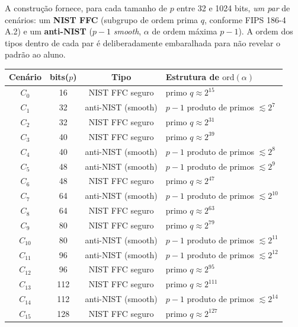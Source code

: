 \documentclass[12pt,a4paper]{article}
\begin{document}
\begin{tcolorbox}[colback=red!5, colframe=red!40, title=\textbf{Tipo de cada cenário e $\mathrm{ord}(\alpha)$}, fonttitle=\small]
\small
A construção fornece, para cada tamanho de $p$ entre 32 e 1024 bits, \emph{um par} de cenários: um \textbf{NIST FFC} (subgrupo de ordem prima $q$, conforme FIPS 186-4 A.2) e um \textbf{anti-NIST} ($p-1$ \emph{smooth}, $\alpha$ de ordem máxima $p-1$). A ordem dos tipos dentro de cada par é deliberadamente embaralhada para não revelar o padrão ao aluno.

\begin{center}
\scriptsize
\begin{tabular}{cccl}
\toprule
\textbf{Cenário} & \textbf{bits($p$)} & \textbf{Tipo} & \textbf{Estrutura de $\mathrm{ord}(\alpha)$} \\
\midrule
$C_0$    & 16   & NIST FFC seguro    & primo $q \approx 2^{15}$ \\
$C_1$    & 32   & anti-NIST (smooth) & $p-1$ produto de primos $\lesssim 2^{7}$ \\
$C_2$    & 32   & NIST FFC seguro    & primo $q \approx 2^{31}$ \\
$C_3$    & 40   & NIST FFC seguro    & primo $q \approx 2^{39}$ \\
$C_4$    & 40   & anti-NIST (smooth) & $p-1$ produto de primos $\lesssim 2^{8}$ \\
$C_5$    & 48   & anti-NIST (smooth) & $p-1$ produto de primos $\lesssim 2^{9}$ \\
$C_6$    & 48   & NIST FFC seguro    & primo $q \approx 2^{47}$ \\
$C_7$    & 64   & anti-NIST (smooth) & $p-1$ produto de primos $\lesssim 2^{10}$ \\
$C_8$    & 64   & NIST FFC seguro    & primo $q \approx 2^{63}$ \\
$C_9$    & 80   & NIST FFC seguro    & primo $q \approx 2^{79}$ \\
$C_{10}$ & 80   & anti-NIST (smooth) & $p-1$ produto de primos $\lesssim 2^{11}$ \\
$C_{11}$ & 96   & anti-NIST (smooth) & $p-1$ produto de primos $\lesssim 2^{12}$ \\
$C_{12}$ & 96   & NIST FFC seguro    & primo $q \approx 2^{95}$ \\
$C_{13}$ & 112  & NIST FFC seguro    & primo $q \approx 2^{111}$ \\
$C_{14}$ & 112  & anti-NIST (smooth) & $p-1$ produto de primos $\lesssim 2^{14}$ \\
$C_{15}$ & 128  & NIST FFC seguro    & primo $q \approx 2^{127}$ \\

\end{tabular}
\end{center}
\end{tcolorbox}
\end{document}
